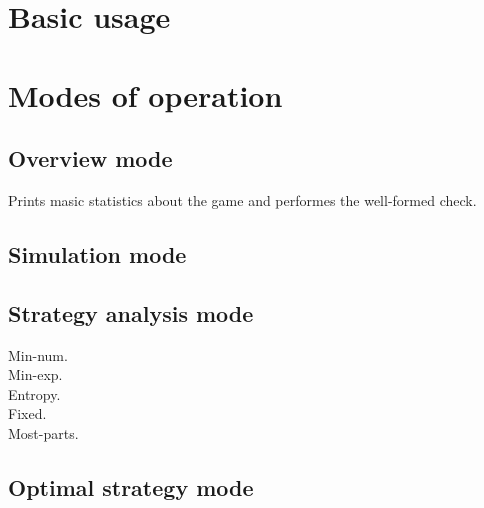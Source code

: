 \section{Basic usage}

\section{Modes of operation}

\subsection{Overview mode}

Prints masic statistics about the game and performes the well-formed check.

\subsection{Simulation mode}

\subsection{Strategy analysis mode}
\begin{description}
\item[Min-num.]
\item[Min-exp.]
\item[Entropy.]
\item[Fixed.]
\item[Most-parts.]
\end{description}

\subsection{Optimal strategy mode}


